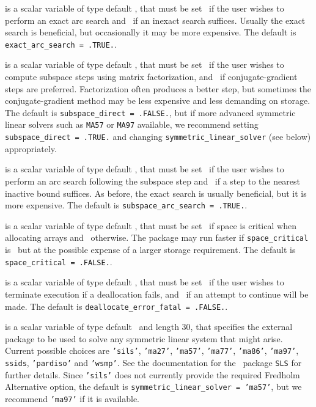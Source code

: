 \begin{description}
 is a scalar variable of type default \logical, that
must be set \true\ if the user wishes to perform an exact arc search
and \false\ if an inexact search suffices. Usually the exact search is
beneficial, but occasionally it may be more expensive.
The default is {\tt exact\_arc\_search = .TRUE.}.

 is a scalar variable of type default \logical, that
must be set \true\ if the user wishes to compute subspace steps using
matrix factorization,
and \false\ if conjugate-gradient steps are preferred. Factorization
often produces a better step, but sometimes the conjugate-gradient method
may be less expensive and less demanding on storage.
The default is {\tt subspace\_direct = .FALSE.}, but if more advanced
symmetric linear solvers such as {\tt MA57} or {\tt MA97} available,
we recommend setting {\tt subspace\_direct = .TRUE.} and changing
{\tt symmetric\_linear\_solver} (see below) appropriately.

 is a scalar variable of type default \logical, that
must be set \true\ if the user wishes to perform an arc search following
the subspace step and \false\ if a step to the nearest inactive bound suffices.
As before, the exact search is usually beneficial, but it is more expensive.
The default is {\tt subspace\_arc\_search = .TRUE.}.

 is a scalar variable of type default \logical,
that must be set \true\ if space is critical when allocating arrays
and  \false\ otherwise. The package may run faster if
{\tt space\_critical} is \false\ but at the possible expense of a larger
storage requirement. The default is {\tt space\_critical = .FALSE.}.

 is a scalar variable of type default \logical,
that must be set \true\ if the user wishes to terminate execution if
a deallocation  fails, and \false\ if an attempt to continue
will be made. The default is {\tt deallocate\_error\_fatal = .FALSE.}.

 is a scalar variable of type default \character\
and length 30, that specifies the external package to be used to
solve any symmetric linear system that might arise. Current possible
choices are {\tt 'sils'}, {\tt 'ma27'}, {\tt 'ma57'}, {\tt 'ma77'},
{\tt 'ma86'}, {\tt 'ma97'}, {\tt ssids}, {\tt 'pardiso'}
and {\tt 'wsmp'}.
See the documentation for the \galahad\ package {\tt SLS} for further details.
Since  {\tt 'sils'} does not currently provide the required Fredholm
Alternative option, the default is {\tt symmetric\_linear\_solver = 'ma57'},
but we recommend {\tt 'ma97'} if it is available.


\end{description}
